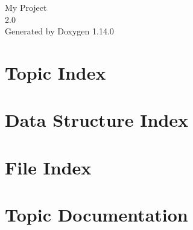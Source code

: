 \documentclass[twoside]{book}
\newcommand{\+}{\discretionary{\mbox{\scriptsize$\hookleftarrow$}}{}{}}
\newcommand{\clearemptydoublepage}{%
    \newpage{\pagestyle{empty}\cleardoublepage}%
  }
\begin{document}
  \raggedbottom
    \hypersetup{pageanchor=false,
                bookmarksnumbered=true,
                pdfencoding=unicode
               }
  \begin{titlepage}
  \vspace*{7cm}
  \begin{center}%
  {\Large My Project}\\
  [1ex]\large 2.\+0 \\
  \vspace*{1cm}
  {\large Generated by Doxygen 1.14.0}\\
  \end{center}
  \end{titlepage}
  \clearemptydoublepage
  \tableofcontents
  \clearemptydoublepage
  \hypersetup{pageanchor=true}
\chapter{Topic Index}

\chapter{Data Structure Index}

\chapter{File Index}

\chapter{Topic Documentation}






\end{document}
